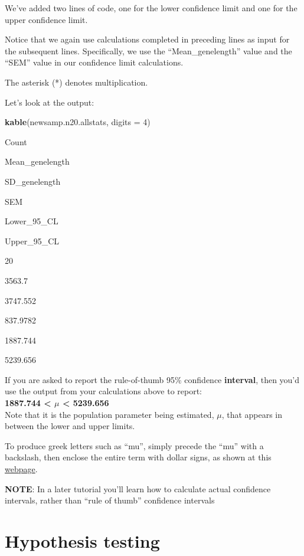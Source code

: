 \documentclass[
]{book}
\newenvironment{Shaded}{\begin{snugshade}}{\end{snugshade}}
\newcommand{\AttributeTok}[1]{\textcolor[rgb]{0.13,0.29,0.53}{#1}}
\newcommand{\DecValTok}[1]{\textcolor[rgb]{0.00,0.00,0.81}{#1}}
\newcommand{\FunctionTok}[1]{\textcolor[rgb]{0.13,0.29,0.53}{\textbf{#1}}}
\newcommand{\NormalTok}[1]{#1}
\begin{document}
We've added two lines of code, one for the lower confidence limit and one for the upper confidence limit.

Notice that we again use calculations completed in preceding lines as input for the subsequent lines. Specifically, we use the ``Mean\_genelength'' value and the ``SEM'' value in our confidence limit calculations.

The asterisk (*) denotes multiplication.

Let's look at the output:

\begin{Shaded}
\begin{Highlighting}[]
\FunctionTok{kable}\NormalTok{(newsamp.n20.allstats, }\AttributeTok{digits =} \DecValTok{4}\NormalTok{)}
\end{Highlighting}
\end{Shaded}

Count

Mean\_genelength

SD\_genelength

SEM

Lower\_95\_CL

Upper\_95\_CL

20

3563.7

3747.552

837.9782

1887.744

5239.656

If you are asked to report the rule-of-thumb 95\% confidence \textbf{interval}, then you'd use the output from your calculations above to report:\\
\textbf{1887.744 \textless{} \(\mu\) \textless{} 5239.656}\\
Note that it is the population parameter being estimated, \(\mu\), that appears in between the lower and upper limits.

To produce greek letters such as ``mu'', simply precede the ``mu'' with a backslash, then enclose the entire term with dollar signs, as shown at this \href{http://www.evanlray.com/stat242_f2019/resources/R/MathinRmd.html}{webpage}.

\textbf{NOTE}: In a later tutorial you'll learn how to calculate actual confidence intervals, rather than ``rule of thumb'' confidence intervals

\chapter{Hypothesis testing}\label{hypothesis}
\end{document}
